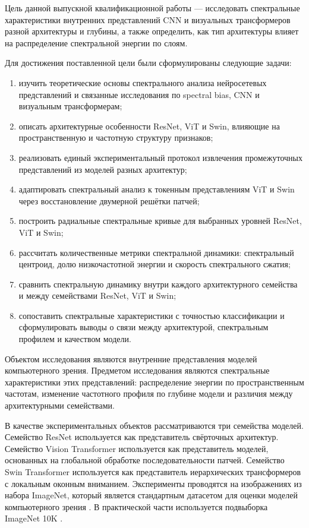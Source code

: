 Цель данной выпускной квалификационной работы — исследовать спектральные характеристики внутренних представлений CNN и визуальных трансформеров разной архитектуры и глубины, а также определить, как тип архитектуры влияет на распределение спектральной энергии по слоям.

Для достижения поставленной цели были сформулированы следующие задачи:

\begin{enumerate}
\item изучить теоретические основы спектрального анализа нейросетевых представлений и связанные исследования по spectral bias, CNN и визуальным трансформерам;
\item описать архитектурные особенности ResNet, ViT и Swin, влияющие на пространственную и частотную структуру признаков;
\item реализовать единый экспериментальный протокол извлечения промежуточных представлений из моделей разных архитектур;
\item адаптировать спектральный анализ к токенным представлениям ViT и Swin через восстановление двумерной решётки патчей;
\item построить радиальные спектральные кривые для выбранных уровней ResNet, ViT и Swin;
\item рассчитать количественные метрики спектральной динамики: спектральный центроид, долю низкочастотной энергии и скорость спектрального сжатия;
\item сравнить спектральную динамику внутри каждого архитектурного семейства и между семействами ResNet, ViT и Swin;
\item сопоставить спектральные характеристики с точностью классификации и сформулировать выводы о связи между архитектурой, спектральным профилем и качеством модели.
\end{enumerate}

Объектом исследования являются внутренние представления моделей компьютерного зрения. Предметом исследования являются спектральные характеристики этих представлений: распределение энергии по пространственным частотам, изменение частотного профиля по глубине модели и различия между архитектурными семействами.

В качестве экспериментальных объектов рассматриваются три семейства моделей. Семейство ResNet используется как представитель свёрточных архитектур. Семейство Vision Transformer используется как представитель моделей, основанных на глобальной обработке последовательности патчей. Семейство Swin Transformer используется как представитель иерархических трансформеров с локальным оконным вниманием. Эксперименты проводятся на изображениях из набора ImageNet, который является стандартным датасетом для оценки моделей компьютерного зрения \cite{deng2009imagenet}. В практической части используется подвыборка ImageNet 10K \cite{priyerana_imagenet10k}.

